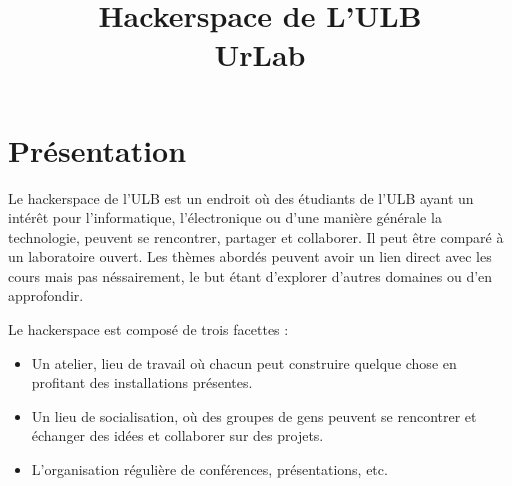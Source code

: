 \documentclass{article}
\title{Hackerspace de L'ULB\\ \fontsize{90}{100}\selectfont UrLab}
\author{ }
\begin{document}
\maketitle{}
\newpage
\tableofcontents
\newpage
\setlength{\parskip}{0.5ex plus 0.2ex minus 0.2ex}
\setlength{\parindent}{0pt}

\section{Présentation}

Le hackerspace de l'ULB est un endroit où des étudiants de l'ULB ayant un intérêt 
pour l'informatique, l'électronique ou d'une manière générale la technologie, 
peuvent se rencontrer, partager et collaborer. Il peut être comparé à un laboratoire ouvert.
Les thèmes abordés peuvent avoir un lien direct avec les cours mais pas néssairement, le but étant d'explorer d'autres domaines ou d'en approfondir.

Le hackerspace est composé de trois facettes : 
\begin{itemize}
\item Un atelier, lieu de travail où chacun peut construire quelque chose en profitant 
des installations présentes.
\item Un lieu de socialisation, où des groupes de gens peuvent se rencontrer
et échanger des idées et collaborer sur des projets.
\item L'organisation régulière de conférences, présentations, etc.\end{itemize}
\end{document}
